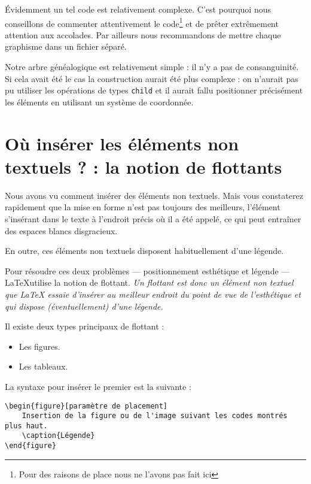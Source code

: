 Évidemment un tel code est relativement complexe. C'est pourquoi nous conseillons de commenter attentivement le code\footnote{Pour des raisons de place nous ne l'avons pas fait ici} et de prêter extrêmement attention  aux accolades. Par ailleurs nous recommandons de mettre chaque graphisme  dans un fichier séparé.


Notre arbre généalogique est relativement simple : il n'y a pas de consanguinité. Si cela avait été le cas la construction aurait été plus complexe : on n'aurait pas pu utiliser les opérations de types \verb|child| et il aurait fallu positionner précisément les éléments en utilisant un système de coordonnée.





\section[La notion de flottants]{Où insérer les éléments non textuels ? : la notion de flottants}
\label{legende}
Nous avons vu comment insérer des éléments non textuels. Mais vous constaterez rapidement que la mise en forme n'est pas toujours des meilleurs, l'élément s'insérant dans le texte à l'endroit précis où il a été appelé, ce qui peut entraîner des espaces blancs disgracieux.

En outre, ces éléments non textuels disposent habituellement d'une légende.

Pour résoudre ces deux problèmes --- positionnement esthétique et légende --- \LaTeX utilise la notion de flottant. \emph{Un flottant est donc un élément non textuel que LaTeX essaie d'insérer au meilleur endroit du point de vue de l'esthétique et qui dispose (éventuellement) d'une légende.}

Il existe deux types principaux de flottant :
\begin{itemize}
	\item Les figures.
	\item Les tableaux.
\end{itemize}

La syntaxe pour insérer le premier est la suivante :

\begin{verbatim}
\begin{figure}[paramètre de placement]
	Insertion de la figure ou de l'image suivant les codes montrés plus haut.
	\caption{Légende}
\end{figure} 
\end{verbatim}

